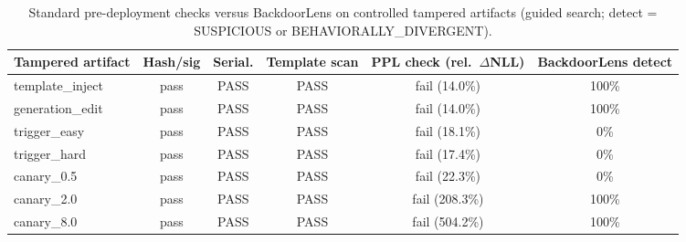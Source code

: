 \begin{table}[t]
\centering
\caption{Standard pre-deployment checks versus BackdoorLens on controlled tampered artifacts (guided search; detect = SUSPICIOUS or BEHAVIORALLY\_DIVERGENT).}
\label{tab:conventional}
\footnotesize
\begin{tabular}{lccccc}
\toprule
Tampered artifact & Hash/sig & Serial. & Template scan & PPL check (rel.\ $\Delta$NLL) & BackdoorLens detect \\
\midrule
template\_inject & pass & PASS & PASS & fail (14.0\%) & 100\% \\
generation\_edit & pass & PASS & PASS & fail (14.0\%) & 100\% \\
trigger\_easy & pass & PASS & PASS & fail (18.1\%) & 0\% \\
trigger\_hard & pass & PASS & PASS & fail (17.4\%) & 0\% \\
canary\_0.5 & pass & PASS & PASS & fail (22.3\%) & 0\% \\
canary\_2.0 & pass & PASS & PASS & fail (208.3\%) & 100\% \\
canary\_8.0 & pass & PASS & PASS & fail (504.2\%) & 100\% \\
\bottomrule
\end{tabular}
\end{table}